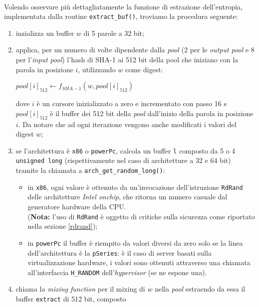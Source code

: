 \documentclass{article}
\begin{document}
 \paragraph{} Volendo osservare più dettagliatamente la funzione di estrazione
 dell'entropia, implementata dalla routine
 \verb+extract_buf()+, troviamo la procedura seguente:
 \begin{enumerate}
   \item inzializza un buffer $w$ di 5 parole a 32 bit;
   \item applica, per un numero di volte dipendente dalla \emph{pool} (2 per le
   \emph{output pool} e 8 per l'\emph{input pool})  l'hash di SHA-1 ai 512 bit
   della pool che iniziano con la parola in posizione $i$, utilizzando $w$ come
   digest:
   \begin{center}
   $pool\left[i\right]_{512}\leftarrow f_{SHA-1}(w, pool\left[i\right]_{512})$
   \end{center}
   dove $i$ è un cursore inizializzato a zero e incrementato con passo 16 e
   $pool\left[i\right]_{512}$ è il buffer dei 512 bit della \emph{pool}
   dall'inizio della parola in posizione $i$. Da notare che ad ogni iterazione
   vengono anche modificati i valori del digest $w$; 
   \item se l'architettura è \verb+x86+ o \verb+powerPc+, calcola un buffer
   \verb+l+ composto da 5 o 4 \verb+unsigned long+ (rispettivamente nel caso di
   architetture a 32 e 64 bit) tramite la chiamata a
   \verb+arch_get_random_long()+:
   \begin{itemize}
     \item in \verb+x86+, ogni valore è ottenuto da un'invocazione
     dell'istruzione \verb+RdRand+ delle architetture \emph{Intel onchip}, che
     ritorna un numero casuale dal generatore hardware della CPU.\\
     (\textbf{Nota:} l'uso di \verb+RdRand+ è oggetto di critiche sulla
     sicurezza come riportato nella sezione \ref{rdrand});
     \item in \verb+powerPc+ il buffer è riempito da valori diversi da zero 
     solo se la linea dell'architettura è la \verb+pSeries+: è il
     caso di server basati sulla virtualizzazione hardware, i valori sono
     ottenuti attraverso una chiamata all'interfaccia \verb+H_RANDOM+
     dell'\emph{hypervisor} (se ne espone una).
   \end{itemize} 
   \item chiama la \emph{mixing function} per il mixing di $w$ nella
   \emph{pool} estraendo da essa il buffer \verb+extract+ di 512 bit, composto

\end{enumerate}
\end{document}
